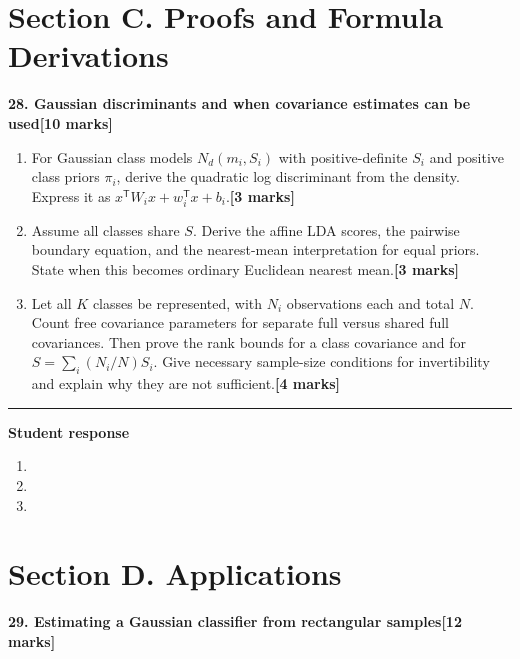 \documentclass[11pt,a4paper]{article}
\newlength{\BlankAnswerHeight}\setlength{\BlankAnswerHeight}{16mm}
\newcommand{\AnswerBlank}{\leavevmode\par\vspace{\BlankAnswerHeight}}
\begin{document}
\newpage\section*{Section C. Proofs and Formula Derivations}
\textbf{28. Gaussian discriminants and when covariance estimates can be used}\hfill\textbf{[10 marks]}\par\medskip
\begin{enumerate}[label=(\alph*),leftmargin=8mm,itemsep=3pt]
\item For Gaussian class models \(N_d(m_i,S_i)\) with positive-definite \(S_i\) and positive class priors \(\pi_i\), derive the quadratic log discriminant from the density. Express it as \(x^\mathsf TW_ix+w_i^\mathsf Tx+b_i\).\hfill\textbf{[3 marks]}
\item Assume all classes share \(S\). Derive the affine LDA scores, the pairwise boundary equation, and the nearest-mean interpretation for equal priors. State when this becomes ordinary Euclidean nearest mean.\hfill\textbf{[3 marks]}
\item Let all \(K\) classes be represented, with \(N_i\) observations each and total \(N\). Count free covariance parameters for separate full versus shared full covariances. Then prove the rank bounds for a class covariance and for \(S=\sum_i(N_i/N)S_i\). Give necessary sample-size conditions for invertibility and explain why they are not sufficient.\hfill\textbf{[4 marks]}
\end{enumerate}\par\medskip\hrule\medskip\textbf{Student response}\par
\begin{enumerate}[label=(\alph*),leftmargin=8mm,itemsep=3pt]
\item
\AnswerBlank
\item
\AnswerBlank
\item
\AnswerBlank
\end{enumerate}
\newpage\section*{Section D. Applications}
\textbf{29. Estimating a Gaussian classifier from rectangular samples}\hfill\textbf{[12 marks]}\par\medskip
\end{document}
